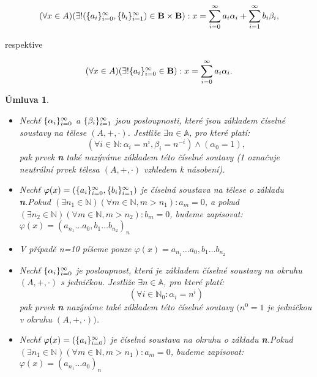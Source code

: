\documentclass[12pt]{book}
\newtheorem*{umluva}{Úmluva}
\begin{document}
$$(\forall x \in A) (\exists!(\{a_i\}_{i=0}^{\infty},\{b_i\}_{i=1}^{\infty})\in\textbf{B}\times\textbf{B}): x = \sum_{i=0}^{\infty} a_{i}\alpha_{i} + \sum_{i=1}^{\infty} b_{i}\beta_{i},$$

respektive

$$(\forall x \in A) (\exists! \{a_i\}_{i=0}^{\infty} \in \textbf{B}): x = \sum_{i=0}^{\infty} a_{i}\alpha_{i}.$$

\begin{umluva}\label{u1} \textbf \newline
	\begin{itemize}
		\item Nechť $\{\alpha_i\}_{i=0}^{\infty}$ a $\{\beta_i\}_{i=1}^{\infty}$  jsou posloupnosti, které jsou základem číselné soustavy na tělese $(A,+,\cdot)$. Jestliže $\exists n \in \mathbb{A}$, pro které platí:
		      $$ (\forall i \in \mathbb{N} : \alpha_i = n^i,\beta_i = n^{-i}) \land (\alpha_{0} = 1),$$
		      pak prvek \textbf{n} také nazýváme základem této číselné soutavy (1 označuje neutrální prvek tělesa $(A,+,\cdot)$ vzhledem k násobení).
		\item Nechť $\varphi(x) = (\{a_i\}_{i=0}^{\infty},\{b_i\}_{i=1}^{\infty})$ je číselná soustava na tělese o základu \textbf{n}.\newline Pokud $(\exists n_1 \in \mathbb{N}) (\forall m \in \mathbb{N},m>n_1):a_m = 0$, a pokud $(\exists n_2 \in \mathbb{N}) (\forall m \in \mathbb{N},m>n_2):b_m = 0$, budeme zapisovat: $\varphi(x) = (a_{n_1} \dots a_0,b_1 \dots b_{n_2})_n$
		\item V případě n=10 píšeme pouze $\varphi(x) = a_{n_1} \dots a_0,b_1 \dots b_{n_2}$
		\item Nechť $\{\alpha_i\}_{i=0}^{\infty}$ je posloupnost, která je základem číselné soustavy na okruhu $(A,+,\cdot)$ s jedničkou. Jestliže $\exists n \in \mathbb{A}$, pro které platí:
		      $$ (\forall i \in \mathbb{N}_0 : \alpha_i = n^i)$$
		      pak prvek \textbf{n} nazýváme také základem této číselné soutavy $(n^0=1$ je jedničkou v okruhu $(A,+,\cdot))$.
		\item Nechť $\varphi(x) = (\{a_i\}_{i=0}^{\infty})$ je číselná soustava na okruhu o základu \textbf{n}.\newline Pokud $(\exists n_1 \in \mathbb{N}) (\forall m \in \mathbb{N},m>n_1):a_m = 0$, budeme zapisovat: $\varphi(x) = (a_{n_1} \dots a_0)_n$

\end{itemize}
\end{umluva}
\end{document}

